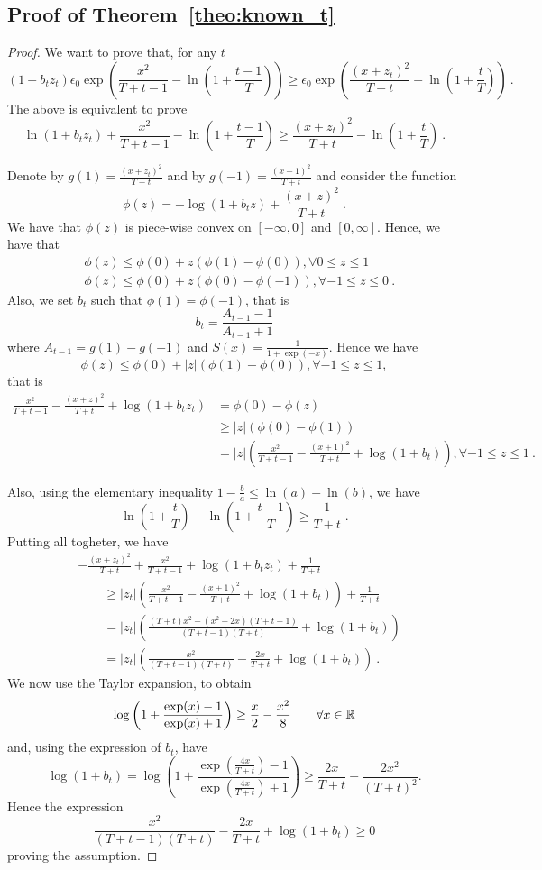 \subsection{Proof of Theorem~\ref{theo:known_t}}
\begin{proof}
We want to prove that, for any $t$
\[
(1+b_t z_t) \epsilon_0 \exp\left(\frac{x^2}{T+t-1} - \ln\left(1+\frac{t-1}{T}\right)\right)
\geq \epsilon_0 \exp\left(\frac{(x+z_t)^2}{T+t} - \ln\left(1+\frac{t}{T}\right)\right)~.
\]
The above is equivalent to prove
\[
\ln(1+b_t z_t) + \frac{x^2}{T+t-1} - \ln\left(1+\frac{t-1}{T}\right)
\geq \frac{(x+z_t)^2}{T+t} - \ln\left(1+\frac{t}{T}\right)~.
\]

Denote by $g(1)=\frac{(x+z_t)^2}{T+t}$ and by $g(-1)=\frac{(x-1)^2}{T+t}$ and consider the function 
\[
\phi(z)=-\log(1+b_t z) + \frac{(x+z)^2}{T+t}~.
\]
We have that $\phi(z)$ is piece-wise convex on $[-\infty,0]$ and $[0,\infty]$. Hence, we have that
\begin{align*}
&\phi(z) \leq \phi(0)+z (\phi(1)-\phi(0)), \forall 0 \leq z\leq 1\\
&\phi(z) \leq \phi(0)+z (\phi(0)-\phi(-1)), \forall -1 \leq z\leq 0~.
\end{align*}
Also, we set $b_t$ such that $\phi(1)=\phi(-1)$, that is
\[
b_t = \frac{A_{t-1}-1}{A_{t-1}+1} 
\]
where $A_{t-1}=g(1)-g(-1)$ and $S(x) =\frac{1}{1+\exp(-x)}$.
Hence we have
\[
\phi(z) \leq \phi(0)+ |z| (\phi(1)-\phi(0)), \forall -1 \leq z\leq 1,
\]
that is
\begin{align*}
\frac{x^2}{T+t-1}-\frac{(x+z)^2}{T+t} + \log(1+b_t z_t) 
& = \phi(0) - \phi(z) \\
& \geq |z| \left(\phi(0) - \phi(1)\right) \\
&= |z| \left(\frac{x^2}{T+t-1} - \frac{(x+1)^2}{T+t} + \log(1+b_t)\right), \forall -1 \leq z\leq 1~.
\end{align*}

Also, using the elementary inequality $1-\frac{b}{a} \leq \ln(a) -\ln(b)$, we have
\[
\ln\left(1+\frac{t}{T}\right) - \ln\left(1+\frac{t-1}{T}\right) \geq \frac{1}{T+t} \;.
\]
Putting all togheter, we have
\begin{align*}
&-\frac{(x+z_t)^2}{T+t} + \frac{x^2}{T+t-1}+\log(1+b_t z_t) +\frac{1}{T+t} \\
&\qquad \geq |z_t| \left(\frac{x^2}{T+t-1} - \frac{(x+1)^2}{T+t} + \log(1+b_t)\right) + \frac{1}{T+t}\\
&\qquad = |z_t| \left(\frac{(T+t) x^2 - (x^2+2 x )(T+t-1) }{(T+t-1)(T+t)} + \log(1+b_t)\right)\\
&\qquad = |z_t| \left(\frac{x^2}{(T+t-1)(T+t)}-\frac{2 x}{T+t} + \log(1+b_t)\right)~.
\end{align*}
We now use the Taylor expansion, to obtain
\[
\log\left(1+\frac{\exp(x)-1}{\exp(x)+1}\right) \geq \frac{x}{2} -\frac{x^2}{8} \qquad \forall x \in \mathbb{R}
\]
and, using the expression of $b_t$, have
\[
\log\left(1+b_t\right) 
= \log\left(1+\frac{\exp\left(\frac{4 x}{T+t}\right)-1}{\exp\left(\frac{4 x}{T+t}\right)+1}\right) 
\geq \frac{2 x}{T+t} -\frac{2 x^2}{(T+t)^2}.
\]
Hence the expression 
\[
\frac{x^2}{(T+t-1)(T+t)}-\frac{2 x}{T+t} + \log(1+b_t) \geq 0
\]
proving the assumption.
\end{proof}
